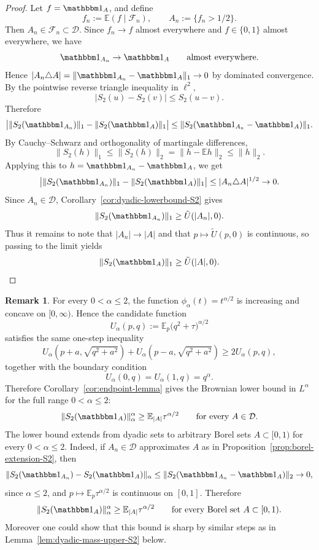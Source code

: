 \documentclass[11pt]{amsart}
\theoremstyle{definition}
\newtheorem{remark}[theorem]{Remark}
\renewcommand{\1}{{\mathbbm{1}}}
\begin{document}
\begin{proof}
Let $f=\mathbbm 1_A$, and define
\[
f_n:=\mathbb E(f\mid\mathcal F_n),
\qquad
A_n:=\{f_n>1/2\}.
\]
Then $A_n\in\mathcal F_n\subset\mathcal D$. Since $f_n\to f$ almost everywhere and $f\in\{0,1\}$ almost everywhere, we have
\[
\mathbbm 1_{A_n}\to \mathbbm 1_A
\qquad\text{almost everywhere.}
\]
Hence $
|A_n\triangle A|
=
\|\mathbbm 1_{A_n}-\mathbbm 1_A\|_1
\to0
$
by dominated convergence.
By the pointwise reverse triangle inequality in $\ell^2$,
\[
|S_2(u)-S_2(v)|\le S_2(u-v).
\]
Therefore
\[
\big|\|S_2(\mathbbm 1_{A_n})\|_1-\|S_2(\mathbbm 1_A)\|_1\big|
\le
\|S_2(\mathbbm 1_{A_n}-\mathbbm 1_A)\|_1.
\]
By Cauchy--Schwarz and orthogonality of martingale differences,
\[
\|S_2(h)\|_1\le \|S_2(h)\|_2=\|h-\mathbb Eh\|_2\le \|h\|_2.
\]
Applying this to $h=\mathbbm 1_{A_n}-\mathbbm 1_A$, we get
\[
\big|\|S_2(\mathbbm 1_{A_n})\|_1-\|S_2(\mathbbm 1_A)\|_1\big|
\le
|A_n\triangle A|^{1/2}\to0.
\]
Since $A_n\in\mathcal D$, Corollary~\ref{cor:dyadic-lowerbound-S2} gives
\[
\|S_2(\mathbbm 1_{A_n})\|_1\ge \tilde U(|A_n|,0).
\]
Thus it remains to note that $|A_n|\to |A|$ and that $p\mapsto \tilde U(p,0)$ is continuous, so passing to the limit yields
\[
\|S_2(\mathbbm 1_A)\|_1\ge \tilde U(|A|,0).
\]
\end{proof}



\begin{remark}\label{rem:possible-alpha-generalization-S2}
For every $0<\alpha\le 2$, the function
$
\phi_\alpha(t)=t^{\alpha/2}
$
is increasing and concave on $[0,\infty)$.
Hence the candidate function
$$
U_\alpha(p,q):=\mathbb E_p\big(q^2+\tau\big)^{\alpha/2}
$$
satisfies the same one-step inequality
$$
U_\alpha\!\left(p+a,\sqrt{q^2+a^2}\right)
+
U_\alpha\!\left(p-a,\sqrt{q^2+a^2}\right)
\ge 2U_\alpha(p,q),
$$
together with the boundary condition
$$
U_\alpha(0,q)=U_\alpha(1,q)=q^\alpha.
$$
Therefore Corollary~\ref{cor:endpoint-lemma} gives the Brownian lower bound in
$L^\alpha$ for the full range $0<\alpha\le 2$:
$$
\|S_2(\mathbbm 1_A)\|_\alpha^\alpha \ge \mathbb E_{|A|}\tau^{\alpha/2}
\qquad \text{for every } A\in\mathcal D.
$$
The lower bound extends from dyadic sets to arbitrary Borel sets
$A\subset[0,1)$ for every $0<\alpha\le2$. Indeed, if $A_n\in\mathcal D$
approximates $A$ as in Proposition~\ref{prop:borel-extension-S2}, then
$$
\|S_2(\mathbbm 1_{A_n})-S_2(\mathbbm 1_A)\|_\alpha
\le
\|S_2(\mathbbm 1_{A_n}-\mathbbm 1_A)\|_2 \to 0,
$$
since $\alpha\le2$, and $p\mapsto \mathbb E_p\tau^{\alpha/2}$ is continuous
on $[0,1]$. Therefore
$$
\|S_2(\mathbbm 1_A)\|_\alpha^\alpha \ge \mathbb E_{|A|}\tau^{\alpha/2}
\qquad \text{for every Borel set } A\subset[0,1).
$$
Moreover one could show that this bound is sharp by similar steps as in Lemma~\ref{lem:dyadic-mass-upper-S2} below.
\end{remark}
\end{document}
